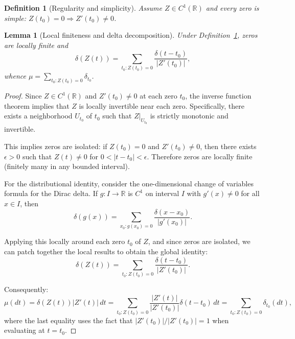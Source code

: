 \documentclass{article}
\newtheorem{lemma}[theorem]{Lemma}
\newtheorem{definition}[theorem]{Definition}
\begin{document}
\begin{definition}[Regularity and simplicity]\label{def:regularity}
Assume $Z\in C^1(\mathbb{R})$ and every zero is simple: $Z(t_0)=0\Rightarrow Z'(t_0)\neq 0$.
\end{definition}

\begin{lemma}[Local finiteness and delta decomposition]\label{lem:delta}
Under Definition~\ref{def:regularity}, zeros are locally finite and
\[
\delta(Z(t))=\sum_{t_0:Z(t_0)=0}\frac{\delta(t-t_0)}{|Z'(t_0)|},
\]
whence $\mu=\sum_{t_0:Z(t_0)=0}\delta_{t_0}$.
\end{lemma}

\begin{proof}
Since $Z\in C^1(\mathbb{R})$ and $Z'(t_0)\neq 0$ at each zero $t_0$, the inverse function theorem implies that $Z$ is locally invertible near each zero. Specifically, there exists a neighborhood $U_{t_0}$ of $t_0$ such that $Z|_{U_{t_0}}$ is strictly monotonic and invertible.

This implies zeros are isolated: if $Z(t_0)=0$ and $Z'(t_0)\neq 0$, then there exists $\epsilon>0$ such that $Z(t)\neq 0$ for $0<|t-t_0|<\epsilon$. Therefore zeros are locally finite (finitely many in any bounded interval).

For the distributional identity, consider the one-dimensional change of variables formula for the Dirac delta. If $g:I\to\mathbb{R}$ is $C^1$ on interval $I$ with $g'(x)\neq 0$ for all $x\in I$, then
\[
\delta(g(x))=\sum_{x_0:g(x_0)=0}\frac{\delta(x-x_0)}{|g'(x_0)|}.
\]

Applying this locally around each zero $t_0$ of $Z$, and since zeros are isolated, we can patch together the local results to obtain the global identity:
\[
\delta(Z(t))=\sum_{t_0:Z(t_0)=0}\frac{\delta(t-t_0)}{|Z'(t_0)|}.
\]

Consequently:
\[
\mu(dt) = \delta(Z(t))|Z'(t)|\,dt = \sum_{t_0:Z(t_0)=0}\frac{|Z'(t)|}{|Z'(t_0)|}\delta(t-t_0)\,dt = \sum_{t_0:Z(t_0)=0}\delta_{t_0}(dt),
\]
where the last equality uses the fact that $|Z'(t_0)|/|Z'(t_0)|=1$ when evaluating at $t=t_0$.
\end{proof}
\end{document}
